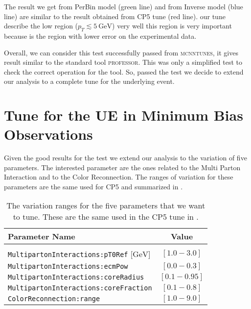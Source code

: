 \noindent The result we get from PerBin model (green line) and from Inverse model (blue line) are similar to the result obtained from CP5 tune (red line). our tune describe the low region ($p_T\lesssim 5\ \mathrm{GeV}$) very well this region is very important because is the region with lower error on the experimental data.

Overall, we can consider this test successfully passed from \textsc{mcnntunes}, it gives result similar to the standard tool \textsc{professor}. This was only a simplified test to check the correct operation for the tool. So, passed the test we decide to extend our analysis to a complete tune for the underlying event.




\section{Tune for the UE in Minimum Bias Observations}

Given the good results for the test we extend our analysis to the variation of five parameters. The interested parameter are the ones related to the Multi Parton Interaction and to the Color Reconnection. The ranges of variation for these parameters are the same used for CP5 and summarized in .

\begin{table}[!htb]
\centering
\begin{tabular}{l | c }
Parameter Name & Value \\ 
\hline \hline
\\[-0.85em]
	\texttt{MultipartonInteractions:pT0Ref} [$\mathrm{GeV}$] & $[1.0 - 3.0]$\\[2pt]
	\texttt{MultipartonInteractions:ecmPow} & $[0.0 - 0.3]$\\[2pt]
	\texttt{MultipartonInteractions:coreRadius} & $[0.1 - 0.95 ]$\\[2pt]
	\texttt{MultipartonInteractions:coreFraction} & $[ 0.1 - 0.8 ]$\\[2pt]
	\texttt{ColorReconnection:range} & $[  1.0 - 9.0 ]$
\end{tabular}
\caption{The variation ranges for the five parameters that we want to tune. These are the same used in the CP5 tune in \cite{CPtunes}.}
\label{table:ranges5params}
\end{table}

